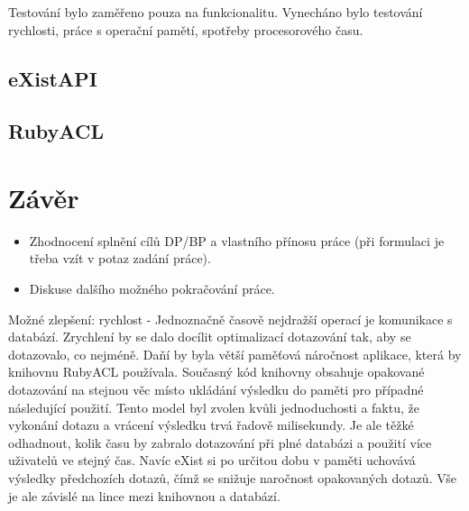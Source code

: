 \documentclass[11pt,twoside,a4paper]{book}
\begin{document}
Testování bylo zaměřeno pouza na funkcionalitu. Vynecháno bylo testování rychlosti, práce s operační pamětí, spotřeby procesorového času. 


\section{eXistAPI}
\section{RubyACL}


\chapter{Závěr}

\begin{itemize}
\item Zhodnocení splnění cílů DP/BP a  vlastního přínosu práce (při formulaci je třeba vzít v potaz zadání práce).
\item Diskuse dalšího možného pokračování práce.
\end{itemize} 

Možné zlepšení: 
rychlost - Jednoznačně časově nejdražší operací je komunikace s databází. Zrychlení by se dalo docílit optimalizací dotazování tak, aby se dotazovalo, co nejméně. Daňí by byla větší paměťová náročnost aplikace, která by knihovnu RubyACL používala. Současný kód knihovny obsahuje opakované dotazování na stejnou věc místo ukládání výsledku do paměti pro případné následující použití. Tento model byl zvolen kvůli jednoduchosti a faktu, že vykonání dotazu a vrácení výsledku trvá řadově milisekundy. Je ale těžké odhadnout, kolik času by zabralo dotazování při plné databázi a použití více uživatelů ve stejný čas. Navíc eXist si po určitou dobu v paměti uchovává výsledky předchozích dotazů, čímž se snižuje naročnost opakovaných dotazů. Vše je ale závislé na lince mezi knihovnou a databází.


%
\end{document}
